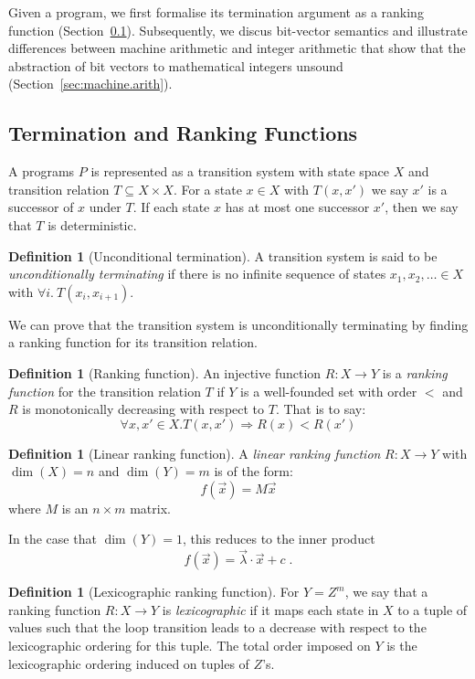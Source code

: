 \documentclass[preprint]{sigplanconf}
\theoremstyle{definition}
\newtheorem{definition}[theorem]{Definition}
\begin{document}
Given a program, we first formalise its termination argument as a ranking
function (Section~\ref{sec:ranking.functions}).  Subsequently, we discus
bit-vector semantics and illustrate differences between machine arithmetic
and integer arithmetic that show that the abstraction of bit vectors to
mathematical integers unsound (Section~\ref{sec:machine.arith}).

\subsection{Termination and Ranking Functions} \label{sec:ranking.functions}

A programs $P$ is represented as a transition system with state space $X$ and
transition relation $T \subseteq X \times X$.  For a state
$x \in X$ with $T(x,x')$ we say $x'$ is a successor of $x$ under $T$.
If each state $x$ has at most one successor $x'$, then we say that $T$ is
deterministic.

\begin{definition}[Unconditional termination]
%
A transition system is said to be \emph{unconditionally terminating} if
there is no infinite sequence of states $x_1, x_2, \ldots \in X$ with
$\forall i.~T(x_i, x_{i+1})$.
%
\end{definition}

We can prove that the transition system is unconditionally terminating by
finding a ranking function for its transition relation.
%
\begin{definition}[Ranking function]
%
An injective function ${R:X\to Y}$ is a \emph{ranking function} for the
transition relation $T$ if $Y$ is a well-founded set with order $<$ and 
$R$ is monotonically decreasing with respect to $T$.  That is
to say:
$$\forall x, x' \in X. T(x, x') \Rightarrow R(x) < R(x')$$
%
\end{definition}

\begin{definition}[Linear ranking function]
A \emph{linear ranking function} $R: X \to Y$ 
with $\dim(X) = n$ and $\dim(Y) = m$ is of the form: $$f(\vec{x}) = M\vec{x}$$ where
$M$ is an $n \times m$ matrix.
\end{definition}

In the case that $\dim(Y) = 1$, this reduces to the inner product
%
$$f(\vec{x}) = \vec{\lambda} \cdotp \vec{x} + c \;.$$

\begin{definition}[Lexicographic ranking function]
For $Y = Z^m$, we say that a ranking function $R: X \to Y$ is \emph{lexicographic}
if it maps each state in $X$ to a tuple of values such that the loop transition leads to a decrease with
respect to the lexicographic ordering for this tuple.
The total order imposed on $Y$ is the lexicographic ordering
induced on tuples of $Z$'s. 
\end{definition}
\end{document}

